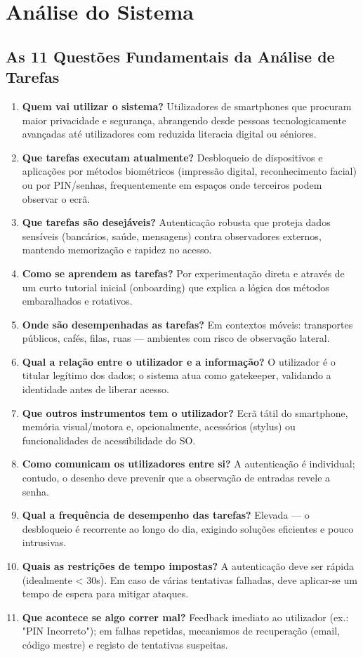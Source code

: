\documentclass[a4paper]{article}
\begin{document}
\section{Análise do Sistema}
\subsection{As 11 Questões Fundamentais da Análise de Tarefas}
\begin{enumerate}[label=\arabic*.]
    \item \textbf{Quem vai utilizar o sistema?} Utilizadores de smartphones que procuram maior privacidade e segurança, abrangendo 
    desde pessoas tecnologicamente avançadas até utilizadores com reduzida literacia digital ou séniores.
    \item \textbf{Que tarefas executam atualmente?} Desbloqueio de dispositivos e aplicações por métodos biométricos (impressão digital, 
    reconhecimento facial) ou por PIN/senhas, frequentemente em espaços onde terceiros podem observar o ecrã.
    \item \textbf{Que tarefas são desejáveis?} Autenticação robusta que proteja dados sensíveis (bancários, saúde, mensagens) contra 
    observadores externos, mantendo memorização e rapidez no acesso.
    \item \textbf{Como se aprendem as tarefas?} Por experimentação direta e através de um curto tutorial inicial (onboarding) que 
    explica a lógica dos métodos embaralhados e rotativos.
    \item \textbf{Onde são desempenhadas as tarefas?} Em contextos móveis: transportes públicos, cafés, filas, ruas — ambientes com 
    risco de observação lateral.
    \item \textbf{Qual a relação entre o utilizador e a informação?} O utilizador é o titular legítimo dos dados; o sistema atua 
    como gatekeeper, validando a identidade antes de liberar acesso.
    \item \textbf{Que outros instrumentos tem o utilizador?} Ecrã tátil do smartphone, memória visual/motora e, opcionalmente, 
    acessórios (stylus) ou funcionalidades de acessibilidade do SO.
    \item \textbf{Como comunicam os utilizadores entre si?} A autenticação é individual; contudo, o desenho deve prevenir que a 
    observação de entradas revele a senha.
    \item \textbf{Qual a frequência de desempenho das tarefas?} Elevada — o desbloqueio é recorrente ao longo do dia, exigindo 
    soluções eficientes e pouco intrusivas.
    \item \textbf{Quais as restrições de tempo impostas?} A autenticação deve ser rápida (idealmente < 30s). Em caso de várias 
    tentativas falhadas, deve aplicar-se um tempo de espera para mitigar ataques.
    \item \textbf{Que acontece se algo correr mal?} Feedback imediato ao utilizador (ex.: "PIN Incorreto"); em falhas repetidas, 
    mecanismos de recuperação (email, código mestre) e registo de tentativas suspeitas.
\end{enumerate}
\end{document}

